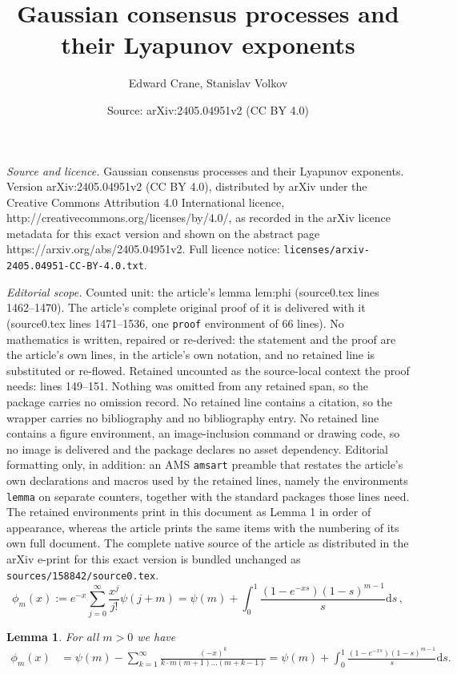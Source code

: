 \documentclass[10pt,a4paper]{amsart}
\title{Gaussian consensus processes and their Lyapunov exponents}
\author{Edward Crane, Stanislav Volkov}
\date{Source: arXiv:2405.04951v2 (CC BY 4.0)}
\newtheorem{lemma}{Lemma}
\begin{document}
\maketitle

\noindent\emph{Source and licence.} Gaussian consensus processes and their Lyapunov exponents. Version arXiv:2405.04951v2 (CC BY 4.0), distributed by arXiv under the Creative Commons Attribution 4.0 International licence, http://creativecommons.org/licenses/by/4.0/, as recorded in the arXiv licence metadata for this exact version and shown on the abstract page https://arxiv.org/abs/2405.04951v2. Full licence notice: \texttt{licenses/arxiv-2405.04951-CC-BY-4.0.txt}.\par\smallskip

\noindent\textit{Editorial scope.} Counted unit: the article's lemma lem:phi (source0.tex lines 1462--1470). The article's complete original proof of it is delivered with it (source0.tex lines 1471--1536, one \texttt{proof} environment of 66 lines). No mathematics is written, repaired or re-derived: the statement and the proof are the article's own lines, in the article's own notation, and no retained line is substituted or re-flowed.  Retained uncounted as the source-local context the proof needs: lines 149--151.  Nothing was omitted from any retained span, so the package carries no omission record.  No retained line contains a citation, so the wrapper carries no bibliography and no bibliography entry.  No retained line contains a figure environment, an image-inclusion command or drawing code, so no image is delivered and the package declares no asset dependency.  Editorial formatting only, in addition: an AMS \texttt{amsart} preamble that restates the article's own declarations and macros used by the retained lines, namely the environments \texttt{lemma} on separate counters, together with the standard packages those lines need.  The retained environments print in this document as Lemma 1 in order of appearance, whereas the article prints the same items with the numbering of its own full document.  The complete native source of the article as distributed in the arXiv e-print for this exact version is bundled unchanged as \texttt{sources/158842/source0.tex}.
\begin{equation} \label{def of phi}
\phi_m(x) := e^{-x} \sum_{j=0}^\infty \frac{x^j}{j!} \psi(j+m)=\psi(m)+\int_0^1 \frac{(1-e^{-xs})(1-s)^{m-1}}{s}\mathrm{d}s\,,
\end{equation}

\begin{lemma}\label{lem:phi}
For all $m>0$ we have
\begin{align*}
\phi_m(x) &=\psi(m)
-\sum_{k=1}^\infty \frac{(-x)^k}{k\cdot m(m+1)\dots(m+k-1)}
=
\psi(m)+\int_0^1 \frac{(1-e^{-xs})(1-s)^{m-1}}{s}\mathrm{d}s.
\end{align*}
\end{lemma}
\end{document}
